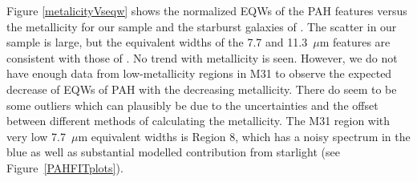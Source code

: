 Figure \ref{metalicityVseqw} shows the normalized EQWs of the PAH features  versus the metallicity for our sample and the starburst 
galaxies of \citet{Engelbracht_2008}. The scatter in our sample is large, but the 	
equivalent widths of the 7.7 and 11.3~$\mu$m features are consistent with those of \citet{Engelbracht_2008}. 
No trend with metallicity is seen.
However, we do not have enough data from low-metallicity regions in M31 to observe the expected decrease of EQWs of PAH with the decreasing 
metallicity.  There do seem to be some outliers which can plausibly be due to the uncertainties  and the offset between different methods of calculating the metallicity.  
The M31 region with very low  7.7~$\mu$m  equivalent widths is Region 8, which has
a noisy spectrum in the blue as well as substantial modelled contribution from starlight (see Figure~\ref{PAHFITplots}).

